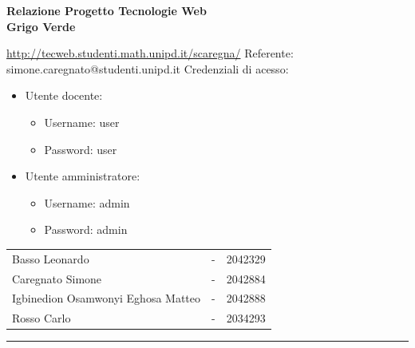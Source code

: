 \begin{titlepage}
\noindent{}
\vspace{15pt}
\textcolor{UM_Brown}{
\begin{flushleft}
    \textbf{\huge{Relazione Progetto Tecnologie Web}}\\
    \vspace{15pt}
    \huge \textbf{Grigo Verde} \\
    \vspace{15pt}
	\begin{normalsize}
    \url{http://tecweb.studenti.math.unipd.it/scaregna/}
	\newline
    Referente: simone.caregnato@studenti.unipd.it
	\newline
	Credenziali di acesso:
		\begin{itemize}
            \item Utente docente:
            \begin{itemize}
                \item[] Username: user
                \item[] Password: user
            \end{itemize}
            \item Utente amministratore:
            \begin{itemize}
                \item[] Username: admin
                \item[] Password: admin
            \end{itemize}
		\end{itemize}
	\end{normalsize}
\end{flushleft}
}
\vspace{40pt}
\textcolor{UM_Brown}{
\begin{flushright}
\begin{scriptsize}
\begin{tabular}{lcl}
    Basso Leonardo & - & 2042329 \\
    Caregnato Simone & - & 2042884 \\
    Igbinedion Osamwonyi Eghosa Matteo & - & 2042888 \\
    Rosso Carlo & - & 2034293 \\
\end{tabular}
\end{scriptsize}
\end{flushright}
\hrule
}
\end{titlepage}

